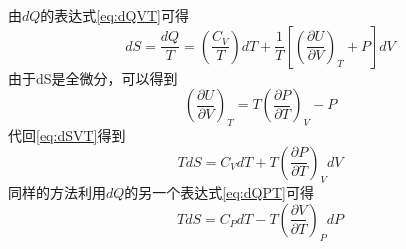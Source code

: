 \documentclass[12pt, a4paper, oneside]{ctexbook}
\newcounter{#2}
\newcounter{#2}[#1]
\numberwithin{#2}{#1}
\newcommand{\xkuo}[1]{\left(#1\right)}
\newcommand{\akuo}[1]{\left[#1\right]}
\newcommand{\pd}[3]{\xkuo{\frac{\partial#1}{\partial#2}}_#3}
\begin{document}
          \begin{deduce}
            由\(dQ\)的表达式\autoref{eq:dQVT}可得
            \begin{equation}\label{eq:dSVT}
              dS=\frac{dQ}{T}=\xkuo{\frac{C_V}{T}}dT+\frac1T\akuo{\pd UVT+P}dV
            \end{equation}
            由于dS是全微分，可以得到
            \begin{equation}
              \left(\frac{\partial U}{\partial V}\right)_T=T\left(\frac{\partial P}{\partial T}\right)_V-P
            \end{equation}
            代回\autoref{eq:dSVT}得到
            \begin{equation}
              T d S=C_V d T+T\left(\frac{\partial P}{\partial T}\right)_V d V
            \end{equation}
            同样的方法利用\(dQ\)的另一个表达式\autoref{eq:dQPT}可得
            \begin{equation}
              T d S=C_P d T-T\left(\frac{\partial V}{\partial T}\right)_P d P
            \end{equation}
          \end{deduce}
\end{document}
